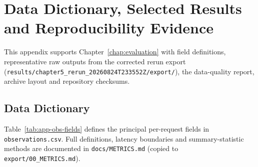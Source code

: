 
\chapter{Data Dictionary, Selected Results and Reproducibility Evidence}
\label{app:experimental-data}

This appendix supports Chapter~\ref{chap:evaluation} with field definitions, representative raw outputs from the corrected rerun export (\texttt{results/chapter5\_rerun\_20260824T233552Z/export/}), the data-quality report, archive layout and repository checksums.

\section{Data Dictionary}
\label{app:data-dictionary}

Table~\ref{tab:app-obs-fields} defines the principal per-request fields in \texttt{observations.csv}. Full definitions, latency boundaries and summary-statistic methods are documented in \texttt{docs/METRICS.md} (copied to \texttt{export/00\_METRICS.md}).


